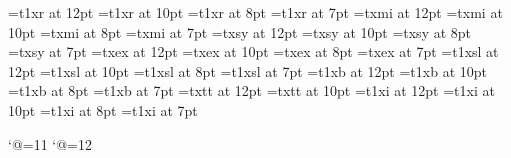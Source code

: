 \font\twelverm=t1xr at 12pt
\font\tenrm=t1xr at 10pt
\font\eightrm=t1xr at 8pt
\font\sevenrm=t1xr at 7pt
\font\twelvei=txmi at 12pt
\font\teni=txmi at 10pt
\font\eighti=txmi at 8pt
\font\seveni=txmi at 7pt
\font\twelvesy=txsy at 12pt
\font\tensy=txsy at 10pt
\font\eightsy=txsy at 8pt
\font\sevensy=txsy at 7pt
\font\twelveex=txex at 12pt
\font\tenex=txex at 10pt
\font\eightex=txex at 8pt
\font\sevenex=txex at 7pt
\font\twelvesl=t1xsl at 12pt
\font\tensl=t1xsl at 10pt
\font\eightsl=t1xsl at 8pt
\font\sevensl=t1xsl at 7pt
\font\twelvebf=t1xb at 12pt
\font\tenbf=t1xb at 10pt
\font\eightbf=t1xb at 8pt
\font\sevenbf=t1xb at 7pt
\font\twelvett=txtt at 12pt
\font\tentt=txtt at 10pt
\font\twelveit=t1xi at 12pt
\font\tenit=t1xi at 10pt
\font\eightit=t1xi at 8pt
\font\sevenit=t1xi at 7pt

\def\twelvepoint{%
\textfont0=\twelverm \scriptfont0=\eightrm
\textfont1=\twelvei	 \scriptfont1=\eighti
\textfont2=\twelvesy \scriptfont2=\eightsy
\textfont3=\twelveex \scriptfont3=\eightex
\textfont\slfam=\twelvesl	  \scriptfont\slfam=\eightsl
\textfont\bffam=\twelvebf	  \scriptfont\bffam=\eightbf
\textfont\ttfam=\twelvett
\textfont\itfam=\twelveit	  \scriptfont\itfam=\eightit
\def\rmr{\fam0          \twelverm   }%
\def\rms{\fam\slfam     \twelvesl   }%
\def\rmb{\fam\bffam     \twelvebf   }%
\def\rm{\rmr \let\sl\rms \let\bf\rmb }
\def\tt{\fam\ttfam     \twelvett   }%
\def\it{\fam\itfam     \twelveit   }%
\normalbaselineskip=14pt
\bigskipamount=12pt plus4pt  minus4pt
\setbox\strutbox=\hbox{\vrule height10pt depth4pt width0pt}%
\def\sc{\tenrm}%
\normalbaselines
\rm}

\def\tenpoint{%
\textfont0=\tenrm \scriptfont0=\sevenrm
\textfont1=\teni	 \scriptfont1=\seveni
\textfont2=\tensy \scriptfont2=\sevensy
\textfont3=\tenex \scriptfont3=\sevenex
\textfont\slfam=\tensl	  \scriptfont\slfam=\sevensl
\textfont\bffam=\tenbf	  \scriptfont\bffam=\sevenbf
\textfont\ttfam=\tentt
\textfont\itfam=\tenit	  \scriptfont\itfam=\sevenit
\def\rm{\fam0          \tenrm   }%
\def\tt{\fam\ttfam     \tentt   }%
\def\it{\fam\itfam     \tenit   }%
\def\sl{\fam\slfam     \tensl   }%
\def\bf{\fam\bffam     \tenbf   }%
\normalbaselineskip=12pt
\bigskipamount=10pt plus3pt minus3pt
\setbox\strutbox=\hbox{\vrule height8.5pt depth3.7pt width0pt}%
\let\sc=\eightrm
\normalbaselines
\rm
}

\catcode`@=11
\gdef\twelvebig#1{{\hbox{$\left#1\vbox to 9.5pt{}\right.\n@space$}}}
\gdef\tenbig#1{{\hbox{$\left#1\vbox to 8pt{}\right.\n@space$}}}
\catcode`@=12

